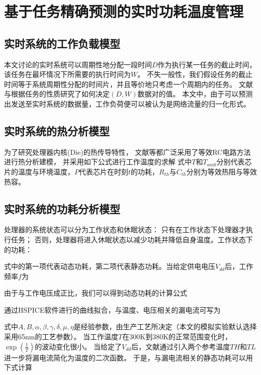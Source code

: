 


\chapter{基于任务精确预测的实时功耗温度管理}
\label{cha:DPTM}

\section{实时系统的工作负载模型}
\label{sec:workload}
本文讨论的实时系统可以周期性地分配一段时间$D$作为执行某一任务的截止时间，该任务在最坏情况下所需要的执行时间为$W$。 不失一般性，我们假设任务的截止时间等于系统周期性分配的时间片，并且等价地只考虑一个周期内的任务。 文献与根据任务的性质研究了如何决定$(D,W)$数据对的值。 本文中，由于可以预测出发送至实时系统的数据量，工作负荷便可以被认为是网络流量的归一化形式。


\section{实时系统的热分析模型}
\label{thermal}
为了研究处理器内核(Die)的热传导特性， 文献等都广泛采用了等效RC电路方法进行热分析建模， 并采用如下公式进行工作温度的求解
式中$T$和$T_{amb}$分别代表芯片的温度与环境温度，$P$代表芯片在时刻$t$的功耗，$R_{th}$与$C_{th}$分别为等效热阻与等效热容。


\section{实时系统的功耗分析模型}
\label{power}

处理器的系统状态可以分为工作状态和休眠状态： 只有在工作状态下处理器才执行任务； 否则，处理器将进入休眠状态以减少功耗并降低自身温度。工作状态下的功耗：

式中的第一项代表动态功耗，第二项代表静态功耗。当给定供电电压$V_{dd}$后，工作频率$f$为

由于与工作电压成正比，我们可以得到动态功耗的计算公式

通过HSPICE软件进行的曲线拟合，与温度、电压相关的漏电流可写为

式中$A,B,\alpha,\beta,\gamma,\delta,\mu,\eta$是经验参数，由生产工艺所决定（本文的模拟实验默认选择采用65nm的工艺参数）。 当工作温度$T$在300K到380K的正常范围变化时，$\exp(\frac{1}{T})$的波动变化很小。 当给定了$V_{dd}$后，文献通过引入两个参考温度$TH$和$TL$进一步将漏电流简化为温度的二次函数。 于是，与漏电流相关的静态功耗可以用下式计算

